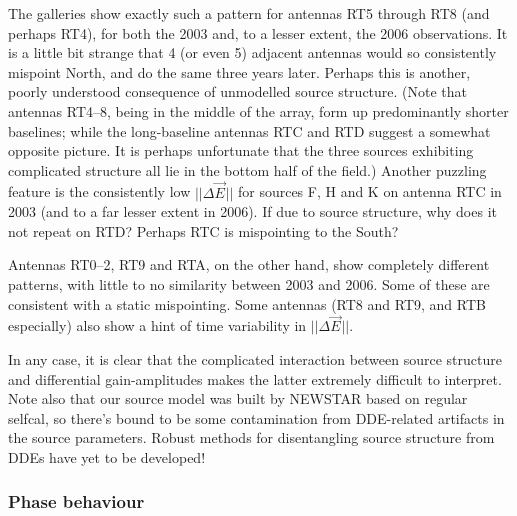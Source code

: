 \documentclass[]{aa}
\newcommand{\jones}[2]{\vec {#1}_{#2}}
\begin{document}
The galleries show exactly such a pattern for antennas RT5 through RT8 (and perhaps RT4), for both the 2003 and, to a lesser extent, the 2006 observations. It is a little bit strange that 4 (or even 5) adjacent antennas would so consistently mispoint North, and do the same three years later. Perhaps this is another, poorly understood consequence of unmodelled source structure. (Note that antennas RT4--8, being in the middle of the array, form up predominantly shorter baselines; while the long-baseline antennas RTC and RTD suggest a somewhat opposite picture. It is perhaps unfortunate that the three sources exhibiting complicated structure all lie in the bottom half of the field.) Another puzzling feature is the consistently low $||\Delta\jones{E}{}||$ for sources F, H and K on antenna RTC in 2003 (and to a far lesser extent in 2006). If due to source structure, why does it not repeat on RTD? Perhaps RTC is mispointing to the South?

Antennas RT0--2, RT9 and RTA, on the other hand, show completely different patterns, with little to no similarity between 2003 and 2006. Some of these are consistent with a static mispointing. Some antennas (RT8 and RT9, and RTB especially) also show a hint of time variability in $||\Delta\jones{E}{}||$.

In any case, it is clear that the complicated interaction between source structure and differential gain-amplitudes makes the latter extremely difficult to interpret. Note also that our source model was built by NEWSTAR based on regular selfcal, so there's bound to be some contamination from DDE-related artifacts in the source parameters. Robust methods for disentangling source structure from DDEs have yet to be developed!

\subsubsection{Phase behaviour}

\end{document}
